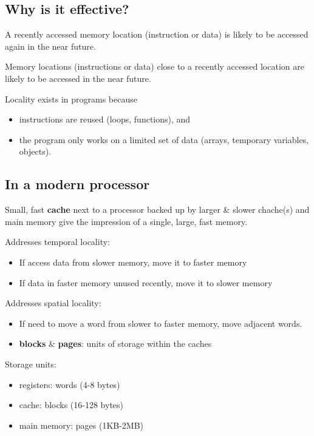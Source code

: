 \documentclass{article}
\begin{document}
\subsection{Why is it effective?}


\begin{definition}
	A recently accessed memory location (instruction or data) is likely to be accessed again in the
	near future.	
\end{definition}
\begin{definition}
	Memory locations (instructions or data) close to a recently accessed location are likely to be
	accessed in the near future.	
\end{definition}
\begin{theorem}
	Locality exists in programs because
	\begin{itemize}
		\item instructions are reused (loops, functions), and
		\item the program only works on a limited set of data (arrays, temporary variables, objects).
	\end{itemize}
\end{theorem}


\subsection{In a modern processor}


Small, fast \textbf{cache} next to a processor backed up by larger \& slower chache(s) and main
memory give the impression of a single, large, fast memory.

Addresses temporal locality:
\begin{itemize}
	\item If access data from slower memory, move it to faster memory
	\item If data in faster memory unused recently, move it to slower memory
\end{itemize}


\noindent Addresses spatial locality:
\begin{itemize}
	\item If need to move a word from slower to faster memory, move adjacent words.
	\item \textbf{blocks} \& \textbf{pages}: units of storage within the caches
\end{itemize}

\noindent Storage units:
\begin{itemize}
	\item registers: words (4-8 bytes)
	\item cache: blocks (16-128 bytes)
	\item main memory: pages (1KB-2MB) 
\end{itemize}
\end{document}
